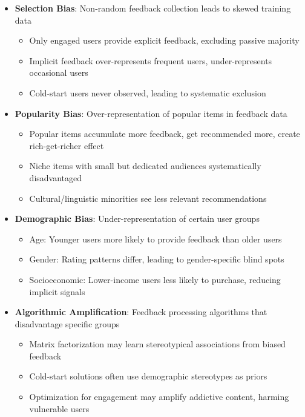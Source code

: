 \begin{itemize}
    \item \textbf{Selection Bias}: Non-random feedback collection leads to skewed training data
    \begin{itemize}
        \item Only engaged users provide explicit feedback, excluding passive majority
        \item Implicit feedback over-represents frequent users, under-represents occasional users
        \item Cold-start users never observed, leading to systematic exclusion
    \end{itemize}
    
    \item \textbf{Popularity Bias}: Over-representation of popular items in feedback data
    \begin{itemize}
        \item Popular items accumulate more feedback, get recommended more, create rich-get-richer effect
        \item Niche items with small but dedicated audiences systematically disadvantaged
        \item Cultural/linguistic minorities see less relevant recommendations
    \end{itemize}
    
    \item \textbf{Demographic Bias}: Under-representation of certain user groups
    \begin{itemize}
        \item Age: Younger users more likely to provide feedback than older users
        \item Gender: Rating patterns differ, leading to gender-specific blind spots
        \item Socioeconomic: Lower-income users less likely to purchase, reducing implicit signals
    \end{itemize}
    
    \item \textbf{Algorithmic Amplification}: Feedback processing algorithms that disadvantage specific groups
    \begin{itemize}
        \item Matrix factorization may learn stereotypical associations from biased feedback
        \item Cold-start solutions often use demographic stereotypes as priors
        \item Optimization for engagement may amplify addictive content, harming vulnerable users
    \end{itemize}
    

\end{itemize}
